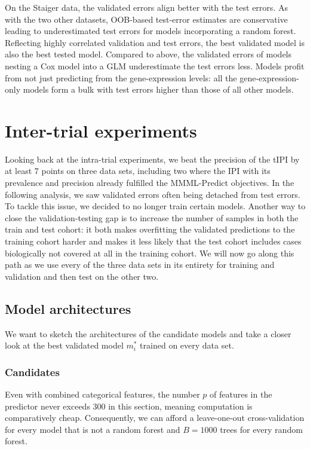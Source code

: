 On the Staiger data, the validated errors align better with the test errors. As with the two other 
datasets, OOB-based test-error estimates are conservative leading to underestimated test errors 
for models incorporating a random forest. Reflecting highly correlated validation and test 
errors, the best validated model is also the best tested model. Compared to above, the validated 
errors of models nesting a Cox model into a GLM underestimate the test errors less.
Models profit from not just predicting from the gene-expression levels: 
all the gene-expression-only models form a bulk with test errors higher than those of all other 
models. 

\section{Inter-trial experiments}\label{sec:inter-trial}

Looking back at the intra-trial experiments, we beat the precision of the tIPI by 
at least \num{7} points on three data sets, including two where the IPI with its prevalence 
and precision already fulfilled the MMML-Predict objectives. 
In the following analysis, we saw validated errors often being detached from test errors. To tackle 
this issue, we decided to no longer train certain models. Another way to close the 
validation-testing gap is to increase the number of samples 
in both the train and test cohort: it both makes overfitting the validated predictions to the 
training cohort harder and makes it less likely that the test cohort includes cases biologically 
not covered at all in the training cohort. We will now go along this path as we use every of the 
three data sets in its entirety for training and validation and then test on the other two.

\subsection{Model architectures}

We want to sketch the architectures of the candidate models and take a closer look at the 
best validated model $m_i^*$ trained on every data set.

\subsubsection{Candidates}

Even with combined categorical features, the number $p$ of features in the predictor 
never exceeds \num{300} in this section, meaning computation is comparatively cheap. 
Consequently, we can afford 
a leave-one-out cross-validation for every model that is not a random forest and $B = \num{1000}$ 
trees for every random forest.

